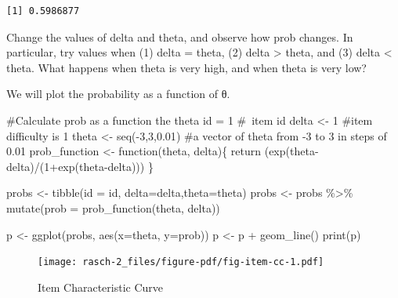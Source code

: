 \documentclass[
  letterpaper,
  DIV=11,
  numbers=noendperiod]{scrreprt}
\newenvironment{Shaded}{\begin{snugshade}}{\end{snugshade}}
\newcommand{\AttributeTok}[1]{\textcolor[rgb]{0.40,0.45,0.13}{#1}}
\newcommand{\CommentTok}[1]{\textcolor[rgb]{0.37,0.37,0.37}{#1}}
\newcommand{\ControlFlowTok}[1]{\textcolor[rgb]{0.00,0.23,0.31}{#1}}
\newcommand{\DecValTok}[1]{\textcolor[rgb]{0.68,0.00,0.00}{#1}}
\newcommand{\FloatTok}[1]{\textcolor[rgb]{0.68,0.00,0.00}{#1}}
\newcommand{\FunctionTok}[1]{\textcolor[rgb]{0.28,0.35,0.67}{#1}}
\newcommand{\NormalTok}[1]{\textcolor[rgb]{0.00,0.23,0.31}{#1}}
\newcommand{\OtherTok}[1]{\textcolor[rgb]{0.00,0.23,0.31}{#1}}
\newcommand{\SpecialCharTok}[1]{\textcolor[rgb]{0.37,0.37,0.37}{#1}}
\begin{document}
\begin{verbatim}
[1] 0.5986877
\end{verbatim}

Change the values of delta and theta, and observe how prob changes. In
particular, try values when (1) delta = theta, (2) delta \textgreater{}
theta, and (3) delta \textless{} theta. What happens when theta is very
high, and when theta is very low?

We will plot the probability as a function of θ.

\begin{Shaded}
\begin{Highlighting}[]
\CommentTok{\#Calculate prob as a function the theta}
\NormalTok{id }\OtherTok{=} \DecValTok{1} \CommentTok{\# item id}
\NormalTok{delta }\OtherTok{\textless{}{-}} \DecValTok{1} \CommentTok{\#item difficulty is 1}
\NormalTok{theta }\OtherTok{\textless{}{-}} \FunctionTok{seq}\NormalTok{(}\SpecialCharTok{{-}}\DecValTok{3}\NormalTok{,}\DecValTok{3}\NormalTok{,}\FloatTok{0.01}\NormalTok{) }\CommentTok{\#a vector of theta from {-}3 to 3 in steps of 0.01}
\NormalTok{prob\_function }\OtherTok{\textless{}{-}} \ControlFlowTok{function}\NormalTok{(theta, delta)\{}
    \FunctionTok{return}\NormalTok{ (}\FunctionTok{exp}\NormalTok{(theta}\SpecialCharTok{{-}}\NormalTok{delta)}\SpecialCharTok{/}\NormalTok{(}\DecValTok{1}\SpecialCharTok{+}\FunctionTok{exp}\NormalTok{(theta}\SpecialCharTok{{-}}\NormalTok{delta)))}
\NormalTok{\}}

\NormalTok{probs }\OtherTok{\textless{}{-}} \FunctionTok{tibble}\NormalTok{(}\AttributeTok{id =}\NormalTok{ id, }\AttributeTok{delta=}\NormalTok{delta,}\AttributeTok{theta=}\NormalTok{theta)}
\NormalTok{probs }\OtherTok{\textless{}{-}}\NormalTok{ probs }\SpecialCharTok{\%\textgreater{}\%} \FunctionTok{mutate}\NormalTok{(}\AttributeTok{prob =} \FunctionTok{prob\_function}\NormalTok{(theta, delta))}

\NormalTok{p }\OtherTok{\textless{}{-}} \FunctionTok{ggplot}\NormalTok{(probs, }\FunctionTok{aes}\NormalTok{(}\AttributeTok{x=}\NormalTok{theta, }\AttributeTok{y=}\NormalTok{prob))}
\NormalTok{p }\OtherTok{\textless{}{-}}\NormalTok{ p }\SpecialCharTok{+} \FunctionTok{geom\_line}\NormalTok{()}
\FunctionTok{print}\NormalTok{(p)}
\end{Highlighting}
\end{Shaded}

\begin{figure}[H]

{\centering \texttt{[image: rasch-2\_files/figure-pdf/fig-item-cc-1.pdf]}

}

\caption{\label{fig-item-cc}Item Characteristic Curve}

\end{figure}
\end{document}
